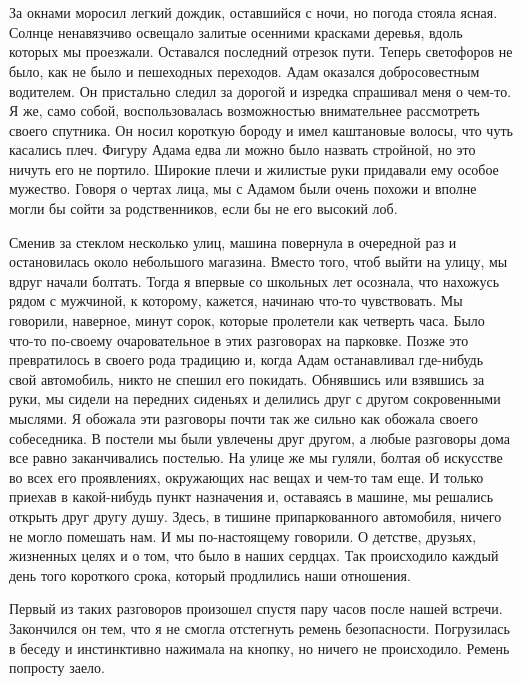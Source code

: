 \documentclass[
]{book}
\begin{document}
\hypertarget{chapter-25}{%
\chapter{~}\label{chapter-25}}

За окнами моросил легкий дождик, оставшийся с ночи, но погода стояла ясная. Солнце ненавязчиво освещало залитые осенними красками деревья, вдоль которых мы проезжали. Оставался последний отрезок пути. Теперь светофоров не было, как не было и пешеходных переходов. Адам оказался добросовестным водителем. Он пристально следил за дорогой и изредка спрашивал меня о чем-то. Я же, само собой, воспользовалась возможностью внимательнее рассмотреть своего спутника. Он носил короткую бороду и имел каштановые волосы, что чуть касались плеч. Фигуру Адама едва ли можно было назвать стройной, но это ничуть его не портило. Широкие плечи и жилистые руки придавали ему особое мужество. Говоря о чертах лица, мы с Адамом были очень похожи и вполне могли бы сойти за родственников, если бы не его высокий лоб.

Сменив за стеклом несколько улиц, машина повернула в очередной раз и остановилась около небольшого магазина. Вместо того, чтоб выйти на улицу, мы вдруг начали болтать. Тогда я впервые со школьных лет осознала, что нахожусь рядом с мужчиной, к которому, кажется, начинаю что-то чувствовать. Мы говорили, наверное, минут сорок, которые пролетели как четверть часа. Было что-то по-своему очаровательное в этих разговорах на парковке. Позже это превратилось в своего рода традицию и, когда Адам останавливал где-нибудь свой автомобиль, никто не спешил его покидать. Обнявшись или взявшись за руки, мы сидели на передних сиденьях и делились друг с другом сокровенными мыслями. Я обожала эти разговоры почти так же сильно как обожала своего собеседника. В постели мы были увлечены друг другом, а любые разговоры дома все равно заканчивались постелью. На улице же мы гуляли, болтая об искусстве во всех его проявлениях, окружающих нас вещах и чем-то там еще. И только приехав в какой-нибудь пункт назначения и, оставаясь в машине, мы решались открыть друг другу душу. Здесь, в тишине припаркованного автомобиля, ничего не могло помешать нам. И мы по-настоящему говорили. О детстве, друзьях, жизненных целях и о том, что было в наших сердцах. Так происходило каждый день того короткого срока, который продлились наши отношения.

Первый из таких разговоров произошел спустя пару часов после нашей встречи. Закончился он тем, что я не смогла отстегнуть ремень безопасности. Погрузилась в беседу и инстинктивно нажимала на кнопку, но ничего не происходило. Ремень попросту заело.
\end{document}
